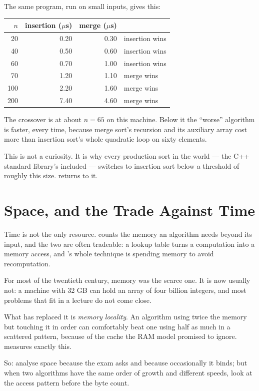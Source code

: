\begin{alertbox}
The same program, run on small inputs, gives this:

\begin{center}
\begin{tabular}{@{}rrrl@{}}
\toprule
\rowcolor{primary!15}
$n$ & insertion ($\mu$s) & merge ($\mu$s) & \\
\midrule
 20 & 0.20 & 0.30 & insertion wins \\
 40 & 0.50 & 0.60 & insertion wins \\
 60 & 0.70 & 1.00 & insertion wins \\
 70 & 1.20 & 1.10 & merge wins \\
100 & 2.20 & 1.60 & merge wins \\
200 & 7.40 & 4.60 & merge wins \\
\bottomrule
\end{tabular}
\end{center}

\smallskip
The crossover is at about $n = 65$ on this machine. Below it the
``worse'' algorithm is faster, every time, because merge sort's recursion and
its auxiliary array cost more than insertion sort's whole quadratic loop on
sixty elements.

\smallskip
This is not a curiosity. It is why every production sort in the world --- the
C++ standard library's included --- switches to insertion sort below a
threshold of roughly this size.  returns to it.
\end{alertbox}

\section{Space, and the Trade Against Time}

Time is not the only resource.  counts the memory an
algorithm needs beyond its input, and the two are often tradeable: a lookup
table turns a computation into a memory access, and 's whole
technique is spending memory to avoid recomputation.

\begin{conceptbox}
For most of the twentieth century, memory was the scarce one. It is now
usually not: a machine with 32 GB can hold an array of four billion integers,
and most problems that fit in a lecture do not come close.

\smallskip
What has replaced it is \emph{memory locality}. An algorithm using twice the
memory but touching it in order can comfortably beat one using half as much in
a scattered pattern, because of the cache the RAM model promised to ignore.
 measures exactly this.

\smallskip
So: analyse space because the exam asks and because occasionally it binds; but
when two algorithms have the same order of growth and different speeds, look at
the access pattern before the byte count.
\end{conceptbox}

